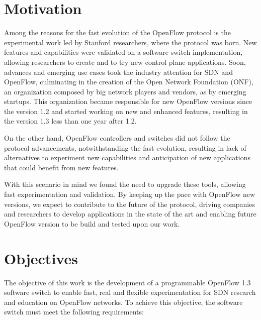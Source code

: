 \section{Motivation}
\label{sec:sec01}

Among the reasons for the fast evolution of the OpenFlow protocol is the experimental work led by Stanford researchers, where the protocol was born. New features and capabilities were validated on a software switch implementation, allowing researchers to create and to try new control plane applications. Soon, advances and emerging use cases took the industry attention for SDN and OpenFlow, culminating in the creation of the Open Network Foundation (ONF), an organization composed by big network players and vendors, as by emerging startups. This organization became responsible for new OpenFlow versions since the version 1.2 and started working on new and enhanced features, resulting in the version 1.3 less than one year after 1.2. 

On the other hand, OpenFlow controllers and switches did not follow the protocol advancements, notwithstanding the fast evolution, resulting in lack of alternatives to experiment new capabilities and anticipation of new applications that could benefit from new features.

With this scenario in mind we found the need to upgrade these tools, allowing fast experimentation and validation. By keeping up the pace with OpenFlow new versions, we expect to contribute to the future of the protocol, driving companies and researchers to develop applications in the state of the art and  enabling future OpenFlow version to be build and tested upon our work.  

\section{Objectives}
\label{sec:sec02}

The objective of this work is the development of a programmable OpenFlow 1.3 software switch to enable fast, real and flexible experimentation for SDN research and education on OpenFlow networks. To achieve this objective, the software switch must meet the following requirements:  

